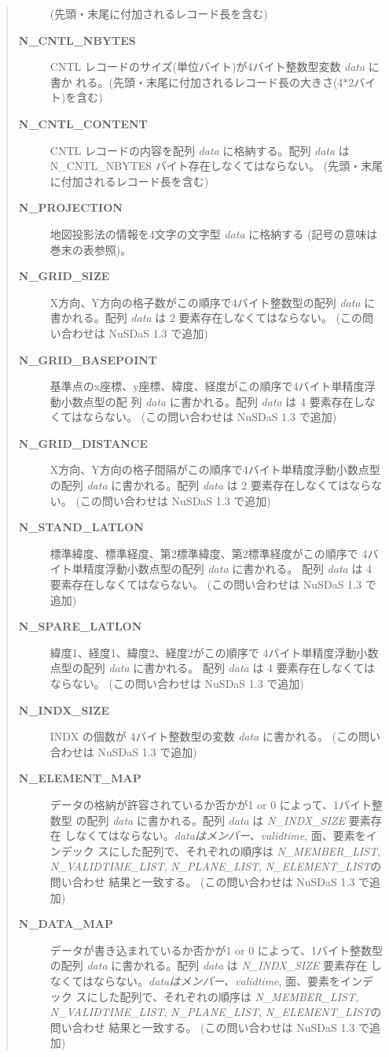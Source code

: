 \begin{quote}
\begin{description}
(先頭・末尾に付加されるレコード長を含む)
\item[{\bf  N\_CNTL\_NBYTES }] 
CNTL レコードのサイズ(単位バイト)が4バイト整数型変数 {\it data} に書か
れる。(先頭・末尾に付加されるレコード長の大きさ(4$\ast$2バイト)を含む)
\item[{\bf  N\_CNTL\_CONTENT }] 
CNTL レコードの内容を配列 {\it data} に格納する。配列 {\it data} は
\newline N\_CNTL\_NBYTES バイト存在しなくてはならない。
(先頭・末尾に付加されるレコード長を含む)
\item[{\bf  N\_PROJECTION }] 
地図投影法の情報を4文字の文字型 {\it data} に格納する
(記号の意味は巻末の表参照)。
\item[{\bf  N\_GRID\_SIZE }] 
X方向、Y方向の格子数がこの順序で4バイト整数型の配列 {\it data} に
書かれる。配列 {\it data} は 2 要素存在しなくてはならない。
(この問い合わせは NuSDaS 1.3 で追加)
\item[{\bf  N\_GRID\_BASEPOINT }] 
基準点のx座標、y座標、緯度、経度がこの順序で4バイト単精度浮動小数点型の配
列 {\it data} に書かれる。配列 {\it data} は 4 要素存在しなくてはならない。
(この問い合わせは NuSDaS 1.3 で追加)
\item[{\bf  N\_GRID\_DISTANCE }] 
X方向、Y方向の格子間隔がこの順序で4バイト単精度浮動小数点型の配列
{\it data} に書かれる。配列 {\it data} は 2 要素存在しなくてはならない。
(この問い合わせは NuSDaS 1.3 で追加)
\item[{\bf  N\_STAND\_LATLON }] 
標準緯度、標準経度、第2標準緯度、第2標準経度がこの順序で
4バイト単精度浮動小数点型の配列 {\it data} に書かれる。
配列 {\it data} は 4 要素存在しなくてはならない。
(この問い合わせは NuSDaS 1.3 で追加)
\item[{\bf  N\_SPARE\_LATLON }] 
緯度1、経度1、緯度2、経度2がこの順序で
4バイト単精度浮動小数点型の配列 {\it data} に書かれる。
配列 {\it data} は 4 要素存在しなくてはならない。
(この問い合わせは NuSDaS 1.3 で追加)
\item[{\bf  N\_INDX\_SIZE }] 
INDX の個数が 4バイト整数型の変数 {\it data} に書かれる。
(この問い合わせは NuSDaS 1.3 で追加)
\item[{\bf  N\_ELEMENT\_MAP }] 
データの格納が許容されているか否かが1 or 0 によって、1バイト整数型
の配列 {\it data} に書かれる。配列 {\it data} は {\it N\_INDX\_SIZE} 要素存在
しなくてはならない。{\it dataはメンバー、validtime}, 面、要素をインデック
スにした配列で、それぞれの順序は {\it N\_MEMBER\_LIST}, 
{\it N\_VALIDTIME\_LIST}, {\it N\_PLANE\_LIST}, {\it N\_ELEMENT\_LIST}の問い合わせ
結果と一致する。
(この問い合わせは NuSDaS 1.3 で追加)
\item[{\bf  N\_DATA\_MAP }] 
データが書き込まれているか否かが1 or 0 によって、1バイト整数型
の配列 {\it data} に書かれる。配列 {\it data} は {\it N\_INDX\_SIZE} 要素存在
しなくてはならない。{\it dataはメンバー、validtime}, 面、要素をインデック
スにした配列で、それぞれの順序は {\it N\_MEMBER\_LIST}, 
{\it N\_VALIDTIME\_LIST}, {\it N\_PLANE\_LIST}, {\it N\_ELEMENT\_LIST}の問い合わせ
結果と一致する。
(この問い合わせは NuSDaS 1.3 で追加)
\end{description}\end{quote}

